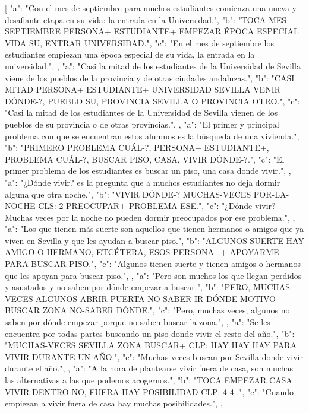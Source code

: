 [
{
"a": "Con el mes de septiembre para muchos estudiantes comienza una nueva y desafiante etapa en su vida: la entrada en la Universidad.",
"b": "TOCA MES SEPTIEMBRE PERSONA+ ESTUDIANTE+ EMPEZAR ÉPOCA ESPECIAL VIDA SU, ENTRAR UNIVERSIDAD.",
"c": "En el mes de septiembre los estudiantes empiezan una época especial de su vida, la entrada en la universidad.",
}
,
{
"a": "Casi la mitad de los estudiantes de la Universidad de Sevilla viene de los pueblos de la provincia y de otras ciudades andaluzas.",
"b": "CASI MITAD PERSONA+ ESTUDIANTE+ UNIVERSIDAD SEVILLA VENIR DÓNDE-?, PUEBLO SU, PROVINCIA SEVILLA O PROVINCIA OTRO.",
"c": "Casi la mitad de los estudiantes de la Universidad de Sevilla vienen de los pueblos de su provincia o de otras provincias.",
}
,
{
"a": "El primer y principal problema con que se encuentran estos alumnos es la búsqueda de una vivienda.",
"b": "PRIMERO PROBLEMA CUÁL-?, PERSONA+ ESTUDIANTE+, PROBLEMA CUÁL-?, BUSCAR PISO, CASA, VIVIR DÓNDE-?.",
"c": "El primer problema de los estudiantes es buscar un piso, una casa donde vivir.",
}
,
{
"a": "¿Dónde vivir? es la pregunta que a muchos estudiantes no deja dormir alguna que otra noche.",
"b": "VIVIR DÓNDE-? MUCHAS-VECES POR-LA-NOCHE CLS: 2  PREOCUPAR+ PROBLEMA ESE.",
"c": "¿Dónde vivir? Muchas veces por la noche no pueden dormir preocupados por ese problema.",
}
,
{
"a": "Los que tienen más suerte son aquellos que tienen hermanos o amigos que ya viven en Sevilla y que les ayudan a buscar piso.",
"b": "ALGUNOS SUERTE HAY AMIGO O HERMANO, ETCÉTERA, ESOS PERSONA++ APOYARME PARA BUSCAR PISO.",
"c": "Algunos tienen suerte y tienen amigos o hermanos que les apoyan para buscar piso.",
}
,
{
"a": "Pero son muchos los que llegan perdidos y asustados y no saben por dónde empezar a buscar.",
"b": "PERO, MUCHAS-VECES ALGUNOS ABRIR-PUERTA NO-SABER IR DÓNDE MOTIVO BUSCAR ZONA NO-SABER DÓNDE.",
"c": "Pero, muchas veces, algunos no saben por dónde empezar porque no saben buscar la zona.",
}
,
{
"a": "Se les encuentra por todas partes buscando un piso donde vivir el resto del año.",
"b": "MUCHAS-VECES SEVILLA ZONA BUSCAR+ CLP: HAY HAY HAY   PARA VIVIR DURANTE-UN-AÑO.",
"c": "Muchas veces buscan por Sevilla donde vivir durante el año.",
}
,
{
"a": "A la hora de plantearse vivir fuera de casa, son muchas las alternativas a las que podemos acogernos.",
"b": "TOCA EMPEZAR CASA VIVIR DENTRO-NO, FUERA HAY POSIBILIDAD CLP: 4 4 .",
"c": "Cuando empiezan a vivir fuera de casa hay muchas posibilidades.",
}
,
